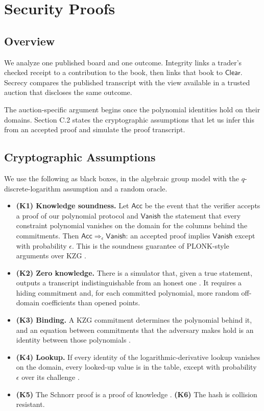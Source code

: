 
\section{Security Proofs}

\subsection{Overview}

We analyze one published board and one outcome. Integrity links a trader's checked receipt to a contribution to the book, then links that book to \(\mathsf{Clear}\). Secrecy compares the published transcript with the view available in a trusted auction that discloses the same outcome.

The auction-specific argument begins once the polynomial identities hold on their domains. Section C.2 states the cryptographic assumptions that let us infer this from an accepted proof and simulate the proof transcript.

\subsection{Cryptographic Assumptions}

We use the following as black boxes, in the algebraic group model with the \(q\)-discrete-logarithm assumption and a random oracle.

\begin{itemize}
\item
  \textbf{(K1) Knowledge soundness.} Let \(\mathsf{Acc}\) be the event that the verifier accepts a proof of our polynomial protocol and \(\mathsf{Vanish}\) the statement that every constraint polynomial vanishes on the domain for the columns behind the commitments. Then \(\mathsf{Acc} \Rightarrow_\epsilon \mathsf{Vanish}\): an accepted proof implies \(\mathsf{Vanish}\) except with probability \(\epsilon\). This is the soundness guarantee of PLONK-style arguments over KZG \cite{marlin2020,plonk2019}.
\item
  \textbf{(K2) Zero knowledge.} There is a simulator that, given a true statement, outputs a transcript indistinguishable from an honest one \cite{lipmaa2025,sefranek2024}. It requires a hiding commitment and, for each committed polynomial, more random off-domain coefficients than opened points.
\item
  \textbf{(K3) Binding.} A KZG commitment determines the polynomial behind it, and an equation between commitments that the adversary makes hold is an identity between those polynomials \cite{kzg2010}.
\item
  \textbf{(K4) Lookup.} If every identity of the logarithmic-derivative lookup vanishes on the domain, every looked-up value is in the table, except with probability \(\epsilon\) over its challenge \cite{habock2022}.
\item
  \textbf{(K5)} The Schnorr proof is a proof of knowledge \cite{schnorr1991}. \textbf{(K6)} The hash is collision resistant.
\end{itemize}

